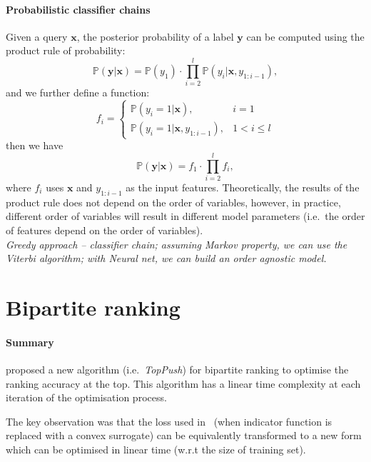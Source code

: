 \documentclass[9pt]{extarticle}
\newcommand{\x}{\mathbf{x}}
\newcommand{\y}{\mathbf{y}}
\newcommand{\1}{\mathbf{1}}
\newcommand{\p}{\mathbb{P}}
\newcommand{\ie}{i.e.\ }
\begin{document}
\paragraph{Probabilistic classifier chains}
Given a query $\x$, the posterior probability of a label $\y$ can be computed using the product rule of probability:
\begin{equation*}
\p(\y |\x) = \p(y_1) \cdot \prod_{i=2}^l \p(y_i |\x, y_{1:i-1}),
\end{equation*}
and we further define a function:
\begin{equation*}
f_i = 
\begin{cases}
\p(y_i = 1 |\x), & i = 1 \\
\p(y_i = 1 |\x, y_{1:i-1}), & 1 < i \le l
\end{cases}
\end{equation*}
then we have
\begin{equation*}
\p(\y |\x) = f_1 \cdot \prod_{i=2}^l f_i,
\end{equation*}
where $f_i$ uses $\x$ and $y_{1:i-1}$ as the input features. 
Theoretically, the results of the product rule does not depend on the order of variables, 
however, in practice, different order of variables will result in different model parameters (\ie the order of features depend on the order of variables). \\
\emph{Greedy approach -- classifier chain; assuming Markov property, we can use the Viterbi algorithm; with Neural net, we can build an order agnostic model.}


\section{Bipartite ranking}
\label{sec:birank}

\paragraph{Summary}
\citet{li:2014} proposed a new algorithm (\ie \emph{TopPush}) for bipartite ranking to optimise the ranking accuracy at the top.
This algorithm has a linear time complexity at each iteration of the optimisation process.

The key observation was that the loss used in~\cite{agarwal:2011} (when indicator function is replaced with a convex surrogate)
can be equivalently transformed to a new form 
which can be optimised in linear time (w.r.t the size of training set).
\end{document}
